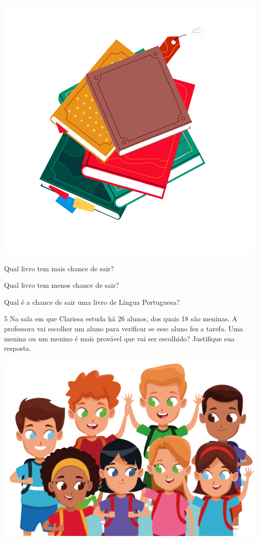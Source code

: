 \begin{center}
\includegraphics[width=.5\textwidth]{media/image37f.png}
\end{center}

\begin{escolha}
\item
  Qual livro tem mais chance de sair?

\item
  Qual livro tem menos chance de sair?

\item
  Qual é a chance de sair uma livro de Língua Portuguesa?
\end{escolha}

\num{5} Na sala em que Clarissa estuda há 26 alunos, dos quais 18 são meninas. A
professora vai escolher um aluno para verificar se esse aluno fez a tarefa.
Uma menina ou um menino é mais provável que vai ser escolhido? Justifique sua resposta.

\begin{center}
\includegraphics[width=\textwidth]{media/image37g.png}
\end{center}

